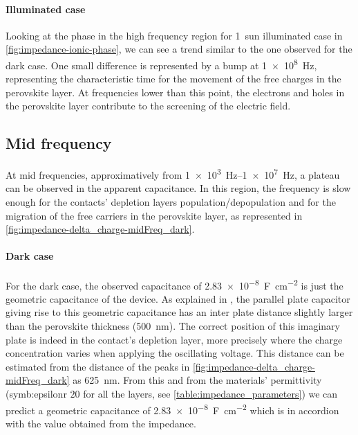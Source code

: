 		\paragraph{Illuminated case}
		Looking at the phase in the high frequency region for \SI{1}{sun} illuminated case in \cref{fig:impedance-ionic-phase}, we can see a trend similar to the one observed for the dark case.
		One small difference is represented by a bump at \SI{1e8}{\Hz}, representing the characteristic time for the movement of the free charges in the perovskite layer.
		At frequencies lower than this point, the electrons and holes in the perovskite layer contribute to the screening of the electric field.




	\subsection{Mid frequency}
		At mid frequencies, approximatively from \SIrange{1e3}{1e7}{\Hz}, a plateau can be observed in the apparent capacitance.
		In this region, the frequency is slow enough for the contacts' depletion layers population/depopulation and for the migration of the free carriers in the perovskite layer, as represented in \cref{fig:impedance-delta_charge-midFreq_dark}.

		\paragraph{Dark case}
		For the dark case, the observed capacitance of \SI{2.83e-8}{\farad\per\square\cm} is just the geometric capacitance of the device.
		As explained in , the parallel plate capacitor giving rise to this geometric capacitance has an inter plate distance slightly larger than the perovskite thickness (\SI{500}{\nm}).
		The correct position of this imaginary plate is indeed in the contact's depletion layer, more precisely where the charge concentration varies when applying the oscillating voltage.
		This distance can be estimated from the distance of the peaks in \cref{fig:impedance-delta_charge-midFreq_dark} as \SI{625}{\nm}.
		From this and from the materials' permittivity (\gls{symb:epsilonr} $20$ for all the layers, see \cref{table:impedance_parameters}) we can predict a geometric capacitance of \SI{2.83e-8}{\farad\per\square\cm} which is in accordion with the value obtained from the impedance.

